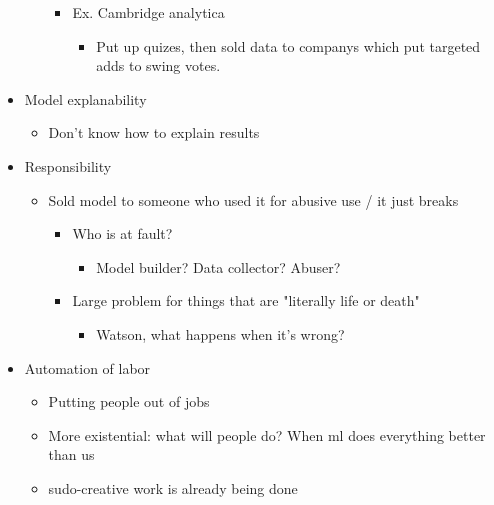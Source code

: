 \documentclass[letterpaper]{article}
\begin{document}
\begin{itemize}
\begin{itemize}
\begin{itemize}
\item Ex. Cambridge analytica

\begin{itemize}
\item Put up quizes, then sold data to companys which put targeted
adds to swing votes.
\end{itemize}
\end{itemize}
\end{itemize}

\item Model explanability

\begin{itemize}
\item Don't know how to explain results
\end{itemize}

\item Responsibility

\begin{itemize}
\item Sold model to someone who used it for abusive use / it just breaks

\begin{itemize}
\item Who is at fault?

\begin{itemize}
\item Model builder? Data collector? Abuser?
\end{itemize}

\item Large problem for things that are "literally life or death"

\begin{itemize}
\item Watson, what happens when it's wrong?
\end{itemize}
\end{itemize}
\end{itemize}

\item Automation of labor

\begin{itemize}
\item Putting people out of jobs
\item More existential: what will people do? When ml does everything
better than us
\item sudo-creative work is already being done
\end{itemize}


\end{itemize}
\end{document}
